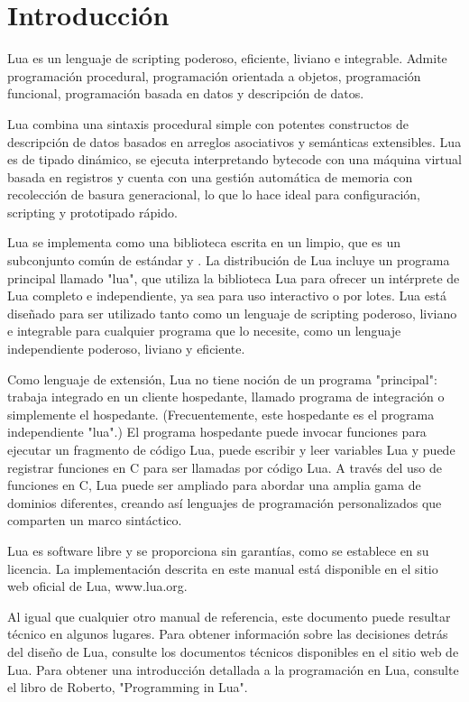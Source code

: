 
\chapter{Introducción}

Lua es un lenguaje de scripting poderoso, eficiente, liviano e integrable. Admite programación procedural, programación orientada a objetos, programación funcional, programación basada en datos y descripción de datos.

Lua combina una sintaxis procedural simple con potentes constructos de descripción de datos basados en arreglos asociativos y semánticas extensibles. Lua es de tipado dinámico, se ejecuta interpretando bytecode con una máquina virtual basada en registros y cuenta con una gestión automática de memoria con recolección de basura generacional, lo que lo hace ideal para configuración, scripting y prototipado rápido.

Lua se implementa como una biblioteca escrita en un  limpio, que es un subconjunto común de  estándar y . La distribución de Lua incluye un programa principal llamado "lua", que utiliza la biblioteca Lua para ofrecer un intérprete de Lua completo e independiente, ya sea para uso interactivo o por lotes. Lua está diseñado para ser utilizado tanto como un lenguaje de scripting poderoso, liviano e integrable para cualquier programa que lo necesite, como un lenguaje independiente poderoso, liviano y eficiente.

Como lenguaje de extensión, Lua no tiene noción de un programa "principal": trabaja integrado en un cliente hospedante, llamado programa de integración o simplemente el hospedante. (Frecuentemente, este hospedante es el programa independiente "lua".) El programa hospedante puede invocar funciones para ejecutar un fragmento de código Lua, puede escribir y leer variables Lua y puede registrar funciones en C para ser llamadas por código Lua. A través del uso de funciones en C, Lua puede ser ampliado para abordar una amplia gama de dominios diferentes, creando así lenguajes de programación personalizados que comparten un marco sintáctico.

Lua es software libre y se proporciona sin garantías, como se establece en su licencia. La implementación descrita en este manual está disponible en el sitio web oficial de Lua, www.lua.org.

Al igual que cualquier otro manual de referencia, este documento puede resultar técnico en algunos lugares. Para obtener información sobre las decisiones detrás del diseño de Lua, consulte los documentos técnicos disponibles en el sitio web de Lua. Para obtener una introducción detallada a la programación en Lua, consulte el libro de Roberto, "Programming in Lua".
